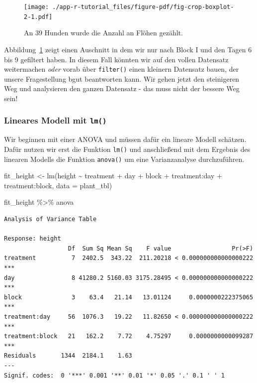 \documentclass[
  letterpaper,
]{scrbook}
\newenvironment{Shaded}{\begin{snugshade}}{\end{snugshade}}
\newcommand{\AttributeTok}[1]{\textcolor[rgb]{0.40,0.45,0.13}{#1}}
\newcommand{\FunctionTok}[1]{\textcolor[rgb]{0.28,0.35,0.67}{#1}}
\newcommand{\NormalTok}[1]{\textcolor[rgb]{0.00,0.23,0.31}{#1}}
\newcommand{\OtherTok}[1]{\textcolor[rgb]{0.00,0.23,0.31}{#1}}
\newcommand{\SpecialCharTok}[1]{\textcolor[rgb]{0.37,0.37,0.37}{#1}}
\begin{document}
\begin{figure}[H]

{\centering \texttt{[image: ./app-r-tutorial\_files/figure-pdf/fig-crop-boxplot-2-1.pdf]}

}

\caption{\label{fig-crop-boxplot-2}An 39 Hunden wurde die Anzahl an
Flöhen gezählt.}

\end{figure}

Abbildung~\ref{fig-crop-boxplot-2} zeigt einen Auschnitt in dem wir nur
nach Block I und den Tagen 6 bis 9 gefiltert haben. In diesem Fall
könnten wir auf den vollen Datensatz weitermachen \emph{oder} vorab über
\texttt{filter()} einen kleinern Datensatz bauen, der unsere
Fragestellung bgut beantworten kann. Wir gehen jetzt den steinigeren Weg
und analysieren den ganzen Datensatz - das muss nicht der bessere Weg
sein!

\hypertarget{lineares-modell-mit-lm}{%
\subsubsection{\texorpdfstring{Lineares Modell mit
\texttt{lm()}}{Lineares Modell mit lm()}}\label{lineares-modell-mit-lm}}

Wir beginnen mit einer ANOVA und müssen dafür ein lineare Modell
schätzen. Dafür nutzen wir erst die Funktion \texttt{lm()} und
anschließend mit dem Ergebnis des linearen Modells die Funktion
\texttt{anova()} um eine Varianzanalyse durchzuführen.

\begin{Shaded}
\begin{Highlighting}[]
\NormalTok{fit\_height }\OtherTok{\textless{}{-}} \FunctionTok{lm}\NormalTok{(height }\SpecialCharTok{\textasciitilde{}}\NormalTok{ treatment }\SpecialCharTok{+}\NormalTok{ day }\SpecialCharTok{+}\NormalTok{ block }\SpecialCharTok{+} 
\NormalTok{                   treatment}\SpecialCharTok{:}\NormalTok{day }\SpecialCharTok{+}\NormalTok{ treatment}\SpecialCharTok{:}\NormalTok{block, }
                 \AttributeTok{data =}\NormalTok{ plant\_tbl)}

\NormalTok{fit\_height }\SpecialCharTok{\%\textgreater{}\%}\NormalTok{ anova}
\end{Highlighting}
\end{Shaded}

\begin{verbatim}
Analysis of Variance Table

Response: height
                  Df  Sum Sq Mean Sq    F value                 Pr(>F)    
treatment          7  2402.5  343.22  211.20218 < 0.000000000000000222 ***
day                8 41280.2 5160.03 3175.28495 < 0.000000000000000222 ***
block              3    63.4   21.14   13.01124     0.0000000222375065 ***
treatment:day     56  1076.3   19.22   11.82650 < 0.000000000000000222 ***
treatment:block   21   162.2    7.72    4.75297     0.0000000000099287 ***
Residuals       1344  2184.1    1.63                                      
---
Signif. codes:  0 '***' 0.001 '**' 0.01 '*' 0.05 '.' 0.1 ' ' 1
\end{verbatim}
\end{document}
